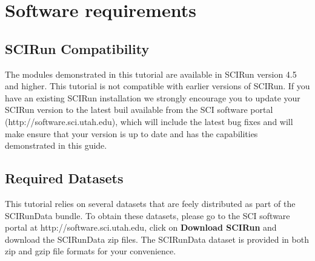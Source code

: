 \section{Software requirements}

\subsection{SCIRun Compatibility}

The modules demonstrated in this tutorial are available in SCIRun
version 4.5 and higher. This tutorial is not compatible with earlier
 versions of SCIRun.  If you have an existing SCIRun installation we
 strongly encourage you to update your SCIRun version
to the latest buil available from the SCI software portal
({http://software.sci.utah.edu}), which will include the latest bug
fixes and will make ensure that your version is up to date and has the capabilities demonstrated in this
guide.

\subsection{Required Datasets}

This tutorial relies on several datasets that are feely distributed as part of the
SCIRunData bundle. To obtain these datasets, please go to the SCI
software portal at {http://software.sci.utah.edu}, click on {\bf
Download SCIRun} and download the SCIRunData zip files. The SCIRunData
dataset is provided in both zip and gzip file formats for your convenience. 

